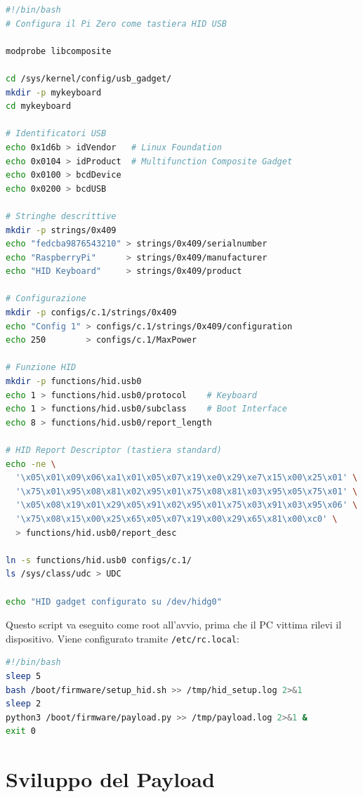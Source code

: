 \documentclass[12pt,a4paper]{article}
\begin{document}
\begin{lstlisting}[language=bash, caption=setup\_hid.sh -- Configurazione gadget HID]
#!/bin/bash
# Configura il Pi Zero come tastiera HID USB

modprobe libcomposite

cd /sys/kernel/config/usb_gadget/
mkdir -p mykeyboard
cd mykeyboard

# Identificatori USB
echo 0x1d6b > idVendor   # Linux Foundation
echo 0x0104 > idProduct  # Multifunction Composite Gadget
echo 0x0100 > bcdDevice
echo 0x0200 > bcdUSB

# Stringhe descrittive
mkdir -p strings/0x409
echo "fedcba9876543210" > strings/0x409/serialnumber
echo "RaspberryPi"      > strings/0x409/manufacturer
echo "HID Keyboard"     > strings/0x409/product

# Configurazione
mkdir -p configs/c.1/strings/0x409
echo "Config 1" > configs/c.1/strings/0x409/configuration
echo 250        > configs/c.1/MaxPower

# Funzione HID
mkdir -p functions/hid.usb0
echo 1 > functions/hid.usb0/protocol    # Keyboard
echo 1 > functions/hid.usb0/subclass    # Boot Interface
echo 8 > functions/hid.usb0/report_length

# HID Report Descriptor (tastiera standard)
echo -ne \
  '\x05\x01\x09\x06\xa1\x01\x05\x07\x19\xe0\x29\xe7\x15\x00\x25\x01' \
  '\x75\x01\x95\x08\x81\x02\x95\x01\x75\x08\x81\x03\x95\x05\x75\x01' \
  '\x05\x08\x19\x01\x29\x05\x91\x02\x95\x01\x75\x03\x91\x03\x95\x06' \
  '\x75\x08\x15\x00\x25\x65\x05\x07\x19\x00\x29\x65\x81\x00\xc0' \
  > functions/hid.usb0/report_desc

ln -s functions/hid.usb0 configs/c.1/
ls /sys/class/udc > UDC

echo "HID gadget configurato su /dev/hidg0"
\end{lstlisting}

Questo script va eseguito come root all'avvio, prima che il PC vittima
rilevi il dispositivo. Viene configurato tramite \texttt{/etc/rc.local}:

\begin{lstlisting}[language=bash, caption=rc.local -- Avvio automatico]
#!/bin/bash
sleep 5
bash /boot/firmware/setup_hid.sh >> /tmp/hid_setup.log 2>&1
sleep 2
python3 /boot/firmware/payload.py >> /tmp/payload.log 2>&1 &
exit 0
\end{lstlisting}

\newpage

\section{Sviluppo del Payload}
\end{document}

